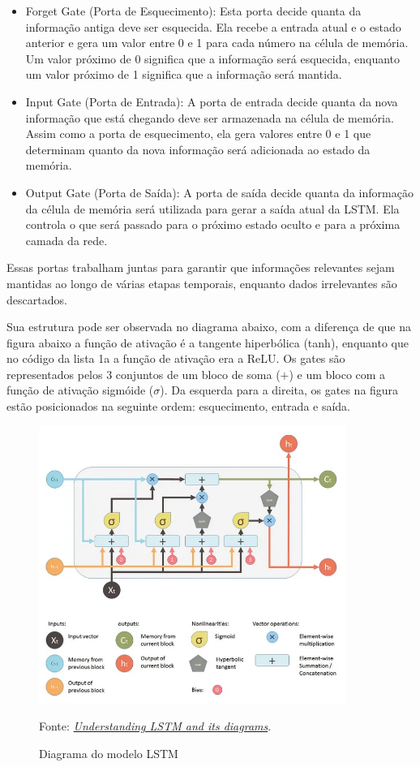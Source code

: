 \documentclass[12 pt]{article}
\begin{document}
\begin{itemize}
    \item Forget Gate (Porta de Esquecimento): Esta porta decide quanta da informação antiga deve ser esquecida. Ela recebe a entrada atual e o estado anterior e gera um valor entre 0 e 1 para cada número na célula de memória. Um valor próximo de 0 significa que a informação será esquecida, enquanto um valor próximo de 1 significa que a informação será mantida.
    \item Input Gate (Porta de Entrada): A porta de entrada decide quanta da nova informação que está chegando deve ser armazenada na célula de memória. Assim como a porta de esquecimento, ela gera valores entre 0 e 1 que determinam quanto da nova informação será adicionada ao estado da memória.
    \item Output Gate (Porta de Saída): A porta de saída decide quanta da informação da célula de memória será utilizada para gerar a saída atual da LSTM. Ela controla o que será passado para o próximo estado oculto e para a próxima camada da rede.
\end{itemize}

Essas portas trabalham juntas para garantir que informações relevantes sejam mantidas ao longo de várias etapas temporais, enquanto dados irrelevantes são descartados.

Sua estrutura pode ser observada no diagrama abaixo, com a diferença de que na figura abaixo a função de ativação é a tangente hiperbólica (tanh), enquanto que no código da lista 1a a função de ativação era a ReLU. Os gates são representados pelos 3 conjuntos de um bloco de soma ($+$) e um bloco com a função de ativação sigmóide ($\sigma$). Da esquerda para a direita, os gates na figura estão posicionados na seguinte ordem: esquecimento, entrada e saída. 

\begin{figure}[H]
    \caption{Diagrama do modelo LSTM}
    \centering
    \includegraphics[width=10cm]{fig/LSTM.jpg}
    \small

    Fonte: \href{https://blog.mlreview.com/understanding-lstm-and-its-diagrams-37e2f46f1714}{\textit{Understanding LSTM and its diagrams}}.
\end{figure}
\end{document}
